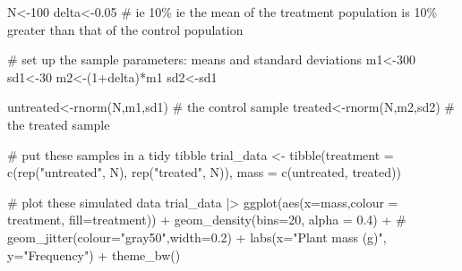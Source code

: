 \documentclass[
  letterpaper,
  DIV=11,
  numbers=noendperiod]{scrreprt}
\newenvironment{Shaded}{\begin{snugshade}}{\end{snugshade}}
\newcommand{\AttributeTok}[1]{\textcolor[rgb]{0.40,0.45,0.13}{#1}}
\newcommand{\CommentTok}[1]{\textcolor[rgb]{0.37,0.37,0.37}{#1}}
\newcommand{\DecValTok}[1]{\textcolor[rgb]{0.68,0.00,0.00}{#1}}
\newcommand{\FloatTok}[1]{\textcolor[rgb]{0.68,0.00,0.00}{#1}}
\newcommand{\FunctionTok}[1]{\textcolor[rgb]{0.28,0.35,0.67}{#1}}
\newcommand{\NormalTok}[1]{\textcolor[rgb]{0.00,0.23,0.31}{#1}}
\newcommand{\OtherTok}[1]{\textcolor[rgb]{0.00,0.23,0.31}{#1}}
\newcommand{\SpecialCharTok}[1]{\textcolor[rgb]{0.37,0.37,0.37}{#1}}
\newcommand{\StringTok}[1]{\textcolor[rgb]{0.13,0.47,0.30}{#1}}
\begin{document}
\begin{Shaded}
\begin{Highlighting}[]
\NormalTok{N}\OtherTok{\textless{}{-}}\DecValTok{100}
\NormalTok{delta}\OtherTok{\textless{}{-}}\FloatTok{0.05} \CommentTok{\# ie 10\% ie the mean of the treatment population is 10\% greater than that of the control population}

\CommentTok{\# set up the sample parameters: means and standard deviations}
\NormalTok{m1}\OtherTok{\textless{}{-}}\DecValTok{300} 
\NormalTok{sd1}\OtherTok{\textless{}{-}}\DecValTok{30}
\NormalTok{m2}\OtherTok{\textless{}{-}}\NormalTok{(}\DecValTok{1}\SpecialCharTok{+}\NormalTok{delta)}\SpecialCharTok{*}\NormalTok{m1}
\NormalTok{sd2}\OtherTok{\textless{}{-}}\NormalTok{sd1}

\NormalTok{untreated}\OtherTok{\textless{}{-}}\FunctionTok{rnorm}\NormalTok{(N,m1,sd1) }\CommentTok{\# the control sample}
\NormalTok{treated}\OtherTok{\textless{}{-}}\FunctionTok{rnorm}\NormalTok{(N,m2,sd2) }\CommentTok{\# the treated sample}

\CommentTok{\# put these samples  in a tidy tibble}
\NormalTok{trial\_data }\OtherTok{\textless{}{-}} \FunctionTok{tibble}\NormalTok{(}\AttributeTok{treatment =} \FunctionTok{c}\NormalTok{(}\FunctionTok{rep}\NormalTok{(}\StringTok{"untreated"}\NormalTok{, N), }\FunctionTok{rep}\NormalTok{(}\StringTok{"treated"}\NormalTok{, N)),}
                     \AttributeTok{mass =} \FunctionTok{c}\NormalTok{(untreated, treated))}
\end{Highlighting}
\end{Shaded}

\begin{Shaded}
\begin{Highlighting}[]
\CommentTok{\# plot these simulated data}
\NormalTok{trial\_data }\SpecialCharTok{|\textgreater{}}
  \FunctionTok{ggplot}\NormalTok{(}\FunctionTok{aes}\NormalTok{(}\AttributeTok{x=}\NormalTok{mass,}\AttributeTok{colour =}\NormalTok{ treatment, }\AttributeTok{fill=}\NormalTok{treatment)) }\SpecialCharTok{+}
  \FunctionTok{geom\_density}\NormalTok{(}\AttributeTok{bins=}\DecValTok{20}\NormalTok{, }\AttributeTok{alpha =} \FloatTok{0.4}\NormalTok{) }\SpecialCharTok{+}
  \CommentTok{\# geom\_jitter(colour="gray50",width=0.2) +}
  \FunctionTok{labs}\NormalTok{(}\AttributeTok{x=}\StringTok{"Plant mass (g)"}\NormalTok{,}
       \AttributeTok{y=}\StringTok{"Frequency"}\NormalTok{) }\SpecialCharTok{+}
  \FunctionTok{theme\_bw}\NormalTok{()}
\end{Highlighting}
\end{Shaded}
\end{document}

